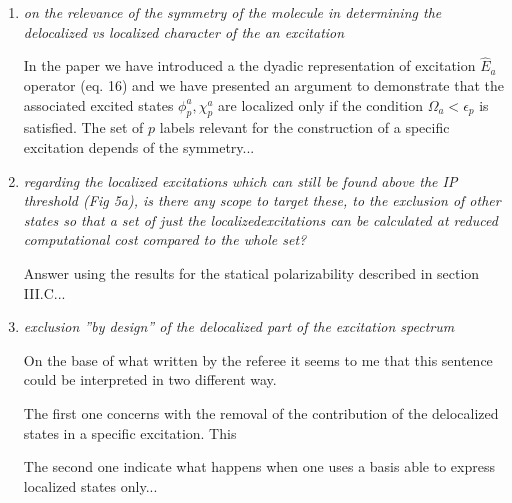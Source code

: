 \documentclass[11pt,a4paper]{article}
\newcommand{\op}[1]{\hat {#1}}
\begin{document}
\begin{enumerate}
 \item \emph{on the relevance of the symmetry of the molecule in determining the delocalized vs localized character of the an excitation}
 
 In the paper we have introduced a the dyadic representation of excitation $\op E_a$ operator (eq. 16) and we have presented an argument to
 demonstrate that the associated excited states $\phi_p^a,\chi_p^a$ are localized only if the condition $\Omega_a<\epsilon_p$ is satisfied. 
 The set of $p$ labels relevant for the construction of a specific excitation depends of the symmetry...
 
 
 \item \emph{regarding the localized excitations which can still be found above the IP threshold (Fig 5a), is there any scope to target these, to the exclusion of other states so that a set of just the localizedexcitations can be calculated at reduced computational cost compared to the whole set?}

 
 Answer using the results for the statical polarizability described in section III.C...
 
 \item \emph{exclusion ''by design'' of the delocalized part of the excitation spectrum}
 
 On the base of what written by the referee it seems to me that this sentence could be interpreted in two different way. 
 
 The first one concerns with the removal of the contribution of the delocalized states in a specific excitation. This  
 
 The second one indicate what happens when one uses a basis able to express localized states only...
 
 
 
\end{enumerate}



\end{document}
